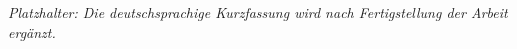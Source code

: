 
\textit{Platzhalter: Die deutschsprachige Kurzfassung wird nach
Fertigstellung der Arbeit ergänzt.}
